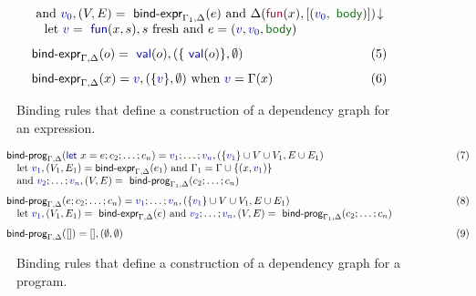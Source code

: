 \documentclass[english,crc]{programming}
\theoremstyle{plain}
\theoremstyle{definition}
\newcommand{\ident}[1]{\textnormal{\textcolor{idclr}{\sffamily #1}}}
\newcommand{\kvd}[1]{\textnormal{\textcolor{kvdclr}{\sffamily #1}}}
\newcommand{\bndclr}[1]{\textcolor{kvdclr}{#1}}
\newcommand{\bnd}[1]{\textnormal{\textcolor{kvdclr}{\sffamily #1}}}
\newcommand{\bknd}[1]{\textnormal{\textcolor{prepclr}{\sffamily #1}}}
\newcommand{\blbl}[1]{\textnormal{\textcolor{numclr}{\sffamily #1}}}
\begin{document}
\begin{figure}[t]
\begin{equation*}
\begin{array}{ll}
~\textnormal{and}~\bndclr{v_0}, (V, E) = \ident{bind-expr}_{\Gamma_1, \Delta}(e)
~\textnormal{and}~\Delta(\bknd{fun}(x),[(\bndclr{v_0}, \blbl{body})])\!\downarrow\\
\quad \textnormal{let}~\bndclr{v} = \bnd{fun}(x, s), s~\textnormal{fresh}
~\textnormal{and}~e = (\bndclr{v},\bndclr{v_0},\blbl{body})
\\[0.75em]
\ident{bind-expr}_{\Gamma, \Delta}(o) = \bnd{val}(o), (\{ \bnd{val}(o) \}, \emptyset) &\hspace{-2em}(5)
\\[0.75em]
\ident{bind-expr}_{\Gamma, \Delta}(x) = \bndclr{v}, (\{ \bndclr{v} \}, \emptyset)~\textnormal{when}~\bndclr{v} = \Gamma(x)&\hspace{-2em}(6)
\end{array}
\end{equation*}
\vspace{-1em}
\caption{Binding rules that define a construction of a dependency graph for an expression.}
\label{fig:binding-rules-expr}
\end{figure}


\begin{figure}[t]
\begin{equation*}
\vspace{-0.5em}
\hspace{-1.5em}
\begin{array}{ll}
\ident{bind-prog}_{\Gamma, \Delta}(\kvd{let}~x=e; c_2; \ldots; c_n) = \bndclr{v_1};\ldots;\bndclr{v_n}, (\{\bndclr{v_1}\} \cup V \cup V_1, E \cup E_1)
  \hspace{9.35em}&\hspace{2.5em}(7)\\
\quad \textnormal{let}~\bndclr{v_1}, (V_1,E_1) = \ident{bind-expr}_{\Gamma,\Delta}(e_1)~\textnormal{and}~\Gamma_1 = \Gamma \cup \{(x,\bndclr{v_1})\} \\
\quad \textnormal{and}~\bndclr{v_2}; \ldots; \bndclr{v_n}, (V, E) = \ident{bind-prog}_{\Gamma_1, \Delta}(c_2; \ldots; c_n)
\\[0.75em]
\ident{bind-prog}_{\Gamma, \Delta}(e; c_2; \ldots; c_n) = \bndclr{v_1};\ldots;\bndclr{v_n}, (\{\bndclr{v_1}\} \cup V \cup V_1, E \cup E_1)&\hspace{2.5em}(8)\\
\quad \textnormal{let}~\bndclr{v_1}, (V_1,E_1) = \ident{bind-expr}_{\Gamma,\Delta}(e)
~\textnormal{and}~\bndclr{v_2}; \ldots; \bndclr{v_n}, (V, E) = \ident{bind-prog}_{\Gamma_1, \Delta}(c_2; \ldots; c_n)
\\[0.75em]
\ident{bind-prog}_{\Gamma, \Delta}([]) = [], (\emptyset, \emptyset)&\hspace{2.5em}(9)
\end{array}
\end{equation*}
\vspace{-1em}
\caption{Binding rules that define a construction of a dependency graph for a program.}
\label{fig:binding-rules-prog}
\vspace{-0.5em}
\end{figure}
\end{document}
